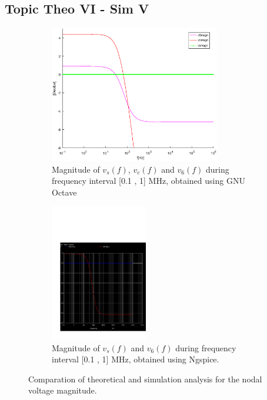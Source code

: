 \subsection{Topic Theo VI - Sim V}
\label{subsec:fifth_topic_error}

\begin{figure}[H]

\begin{subfigure}{0.5\textwidth}
\includegraphics[width=0.9\linewidth, height=6cm]{magnitude.eps} 
\caption{Magnitude of $v_s(f)$,  $v_c(f)$  and $v_6(f)$ during frequency interval [0.1 , 1] MHz, obtained using GNU Octave}
\label{fig:theo_third}
\end{subfigure}
\begin{subfigure}{0.5\textwidth}
\includegraphics[width=0.9\linewidth, height=6cm]{acm.pdf}
\caption{Magnitude of $v_s(f)$ and $v_6(f)$ during frequency interval [0.1 , 1] MHz, obtained using Ngspice.}
\label{fig:total}
\end{subfigure}

\caption{Comparation of theoretical and simulation analysis for the nodal voltage magnitude.}
\label{fig:compar_3}
\end{figure}

